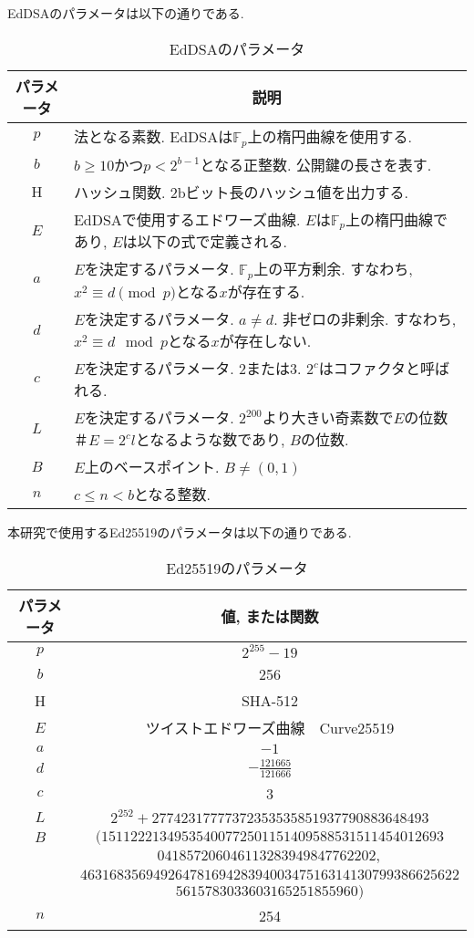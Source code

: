 EdDSAのパラメータは以下の通りである.\\
\begin{table}[htbp]
  \centering
  \begin{tabular}{cp{10cm}}
    \hline
    \multicolumn{1}{c}{パラメータ} & \multicolumn{1}{c}{説明} \\ \hline \hline
    $p$ & 法となる素数. EdDSAは$\mathbb{F}_p$上の楕円曲線を使用する.\\
    $b$ & $b\geq 10$かつ$p<2^{b-1}$となる正整数. 公開鍵の長さを表す.\\
    H & ハッシュ関数. 2bビット長のハッシュ値を出力する. \\
    $E$ & EdDSAで使用するエドワーズ曲線. $E$は$\mathbb{F}_p$上の楕円曲線であり, $E$は以下の式で定義される.\\
    $a$ & $E$を決定するパラメータ. $\mathbb{F}_p$上の平方剰余. すなわち, $x^2\equiv d \pmod{p}$となる$x$が存在する.\\
    $d$ & $E$を決定するパラメータ. $a\neq d$. 非ゼロの非剰余. すなわち, $x^2\equiv d \mod{p}$となる$x$が存在しない.\\
    $c$ & $E$を決定するパラメータ. $2$または$3$. $2^{c}$はコファクタと呼ばれる.\\
    $L$ & $E$を決定するパラメータ. $2^{200}$より大きい奇素数で$E$の位数$＃E=2^{c}l$となるような数であり, $B$の位数.\\
    $B$ & $E$上のベースポイント. $B\neq (0,1)$\\
    $n$ & $c\leq n < b$となる整数.\\ \hline
  \end{tabular}
  \caption{EdDSAのパラメータ}
\end{table}

本研究で使用するEd25519のパラメータは以下の通りである.\\
\begin{longtable}{cc}
  \caption{Ed25519のパラメータ}
  \endfirsthead
  \hline
  \multicolumn{1}{c}{パラメータ} & \multicolumn{1}{c}{値, または関数} \\ \hline \hline
  $p$ & $2^{255}-19$ \\
  $b$ & 256 \\
  H & SHA-512 \\
  $E$ & ツイストエドワーズ曲線　Curve25519 \\
  $a$ & $-1$ \\
  $d$ & $-\frac{121665}{121666}$ \\
  $c$ & 3 \\
  $L$ & $2^{252} + 27742317777372353535851937790883648493$ \\
  $B$ & $(15112221349535400772501151409588531511454012693$ \\
  & $041857206046113283949847762202,$\\
  & $4631683569492647816942839400347516314130799386625622$ \\
  & $5615783033603165251855960)$ \\
  $n$ & 254 \\ \hline
\end{longtable}

